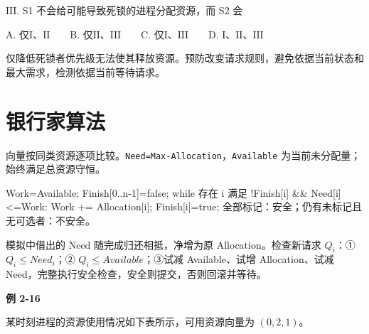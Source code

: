 \ensuremath{\mathrm{III}}. S1 不会给可能导致死锁的进程分配资源，而 S2 会

A. 仅\ensuremath{\mathrm{I}}、\ensuremath{\mathrm{II}}　　B. 仅\ensuremath{\mathrm{II}}、\ensuremath{\mathrm{III}}　　C. 仅\ensuremath{\mathrm{I}}、\ensuremath{\mathrm{III}}　　D. \ensuremath{\mathrm{I}}、\ensuremath{\mathrm{II}}、\ensuremath{\mathrm{III}}

仅降低死锁者优先级无法使其释放资源。预防改变请求规则，避免依据当前状态和最大需求，检测依据当前等待请求。

\section{银行家算法}\label{OS02-banker}

向量按同类资源逐项比较。\texttt{Need=\allowbreak{}Max-Allocation}，\texttt{Available} 为当前未分配量；始终满足总资源守恒。

\par\smallskip\noindent\begin{minipage}{\linewidth}
\begin{codeblock}[language={}]
Work=Available; Finish[0..n-1]=false;
while 存在 i 满足 !Finish[i] && Need[i]<=Work:
    Work += Allocation[i];
    Finish[i]=true;
全部标记：安全；仍有未标记且无可选者：不安全。
\end{codeblock}
\end{minipage}\par\smallskip

模拟中借出的 Need 随完成归还相抵，净增为原 Allocation。检查新请求 \(Q_i\)：{\SNsymbolfont ①} \(Q_i\le Need_i\)；{\SNsymbolfont ②} \(Q_i\le Available\)；{\SNsymbolfont ③}试减 Available、试增 Allocation、试减 Need，完整执行安全检查，安全则提交，否则回滚并等待。

\par\medskip{}\noindent\hypertarget{OS02-E16}{}\label{OS02-E16}\textbf{例 2-16}\par\nobreak\smallskip

某时刻进程的资源使用情况如下表所示，可用资源向量为 \((0,2,1)\)。

